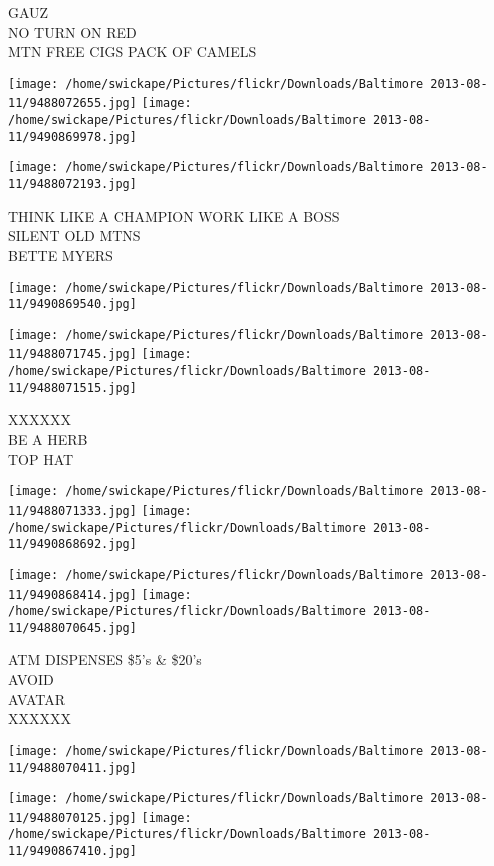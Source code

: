 \documentclass[10pt,letterpaper]{article}
\begin{document}
GAUZ\\
NO TURN ON RED\\
MTN FREE CIGS PACK OF CAMELS
\pagebreak

\texttt{[image: /home/swickape/Pictures/flickr/Downloads/Baltimore 2013-08-11/9488072655.jpg]}
\texttt{[image: /home/swickape/Pictures/flickr/Downloads/Baltimore 2013-08-11/9490869978.jpg]}

\texttt{[image: /home/swickape/Pictures/flickr/Downloads/Baltimore 2013-08-11/9488072193.jpg]}

THINK LIKE A CHAMPION WORK LIKE A BOSS\\
SILENT OLD MTNS\\
BETTE MYERS
\pagebreak

\texttt{[image: /home/swickape/Pictures/flickr/Downloads/Baltimore 2013-08-11/9490869540.jpg]}

\vspace{0.25in}
\texttt{[image: /home/swickape/Pictures/flickr/Downloads/Baltimore 2013-08-11/9488071745.jpg]}
\texttt{[image: /home/swickape/Pictures/flickr/Downloads/Baltimore 2013-08-11/9488071515.jpg]}

XXXXXX\\
BE A HERB\\
TOP HAT
\pagebreak

\texttt{[image: /home/swickape/Pictures/flickr/Downloads/Baltimore 2013-08-11/9488071333.jpg]}
\texttt{[image: /home/swickape/Pictures/flickr/Downloads/Baltimore 2013-08-11/9490868692.jpg]}

\texttt{[image: /home/swickape/Pictures/flickr/Downloads/Baltimore 2013-08-11/9490868414.jpg]}
\texttt{[image: /home/swickape/Pictures/flickr/Downloads/Baltimore 2013-08-11/9488070645.jpg]}

ATM DISPENSES \$5's \& \$20's\\
AVOID\\
AVATAR\\
XXXXXX
\pagebreak

\texttt{[image: /home/swickape/Pictures/flickr/Downloads/Baltimore 2013-08-11/9488070411.jpg]}

\vspace{0.25in}
\texttt{[image: /home/swickape/Pictures/flickr/Downloads/Baltimore 2013-08-11/9488070125.jpg]}
\texttt{[image: /home/swickape/Pictures/flickr/Downloads/Baltimore 2013-08-11/9490867410.jpg]}
\end{document}
